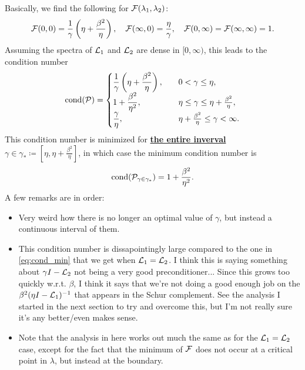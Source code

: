 \documentclass[a4paper,10pt]{article}
\begin{document}
{Basically, we find the following for ${\cal F}(\lambda_1, \lambda_2)$:
\begin{align}
{\cal F}(0,0) = \frac{1}{\gamma} \left( \eta + \frac{\beta^2}{\eta} \right), 
\quad 
{\cal F}(\infty, 0) = \frac{\eta}{\gamma},
\quad 
{\cal F}(0, \infty) = {\cal F}(\infty, \infty) = 1.
\end{align}
Assuming the spectra of  ${\cal L}_1$ and ${\cal L}_2$ are dense in $[0, \infty)$, this leads to the condition number
\begin{align}
\textrm{cond} ({\cal P}) = 
\begin{cases}
\displaystyle
\frac{1}{\gamma} \left( \eta + \frac{\beta^2}{\eta} \right), \quad &0 < \gamma \leq \eta, \\
\displaystyle
1 + \frac{\beta^2}{\eta^2}, \quad &\eta \leq \gamma \leq \eta + \frac{\beta^2}{\eta}, \\
\displaystyle
\frac{\gamma}{\eta}, \quad &\eta + \frac{\beta^2}{\eta} \leq \gamma < \infty.
\end{cases}
\end{align}
This condition number is minimized for \underline{\textbf{the entire inverval}} $\gamma \in \gamma_*  \coloneqq [\eta, \eta + \frac{\beta^2}{\eta}]$, in which case the minimum condition number is
\begin{align}
\textrm{cond} ({\cal P}_{\gamma \in \gamma_*}) = 1 + \frac{\beta^2}{\eta^2}.
\end{align}
A few remarks are in order:
\begin{itemize}
\setlength\itemsep{2ex}
 
\item Very weird how there is no longer an optimal value of $\gamma$, but instead a continuous interval of them. 

\item This condition number is dissapointingly large compared to the one in \eqref{eq:cond_min} that we get when ${\cal L}_1 = {\cal L}_2$. I think this is saying something about $\gamma I - {\cal L}_2$ not being a very good preconditioner... Since this grows too quickly w.r.t. $\beta$, I think it says that we're not doing a good enough job on the $\beta^2 (\eta I - {\cal L}_1)^{-1}$ that appears in the Schur complement. See the analysis I started in the next section to try and overcome this, but I'm not really sure it's any better/even makes sense.
  
\item Note that the analysis in here works out much the same as for the ${\cal L}_1 = {\cal L}_2$ case, except for the fact that the minimum of ${\cal F}$ does not occur at a critical point in $\lambda$, but instead at the boundary.
 

\end{itemize}}
\end{document}
